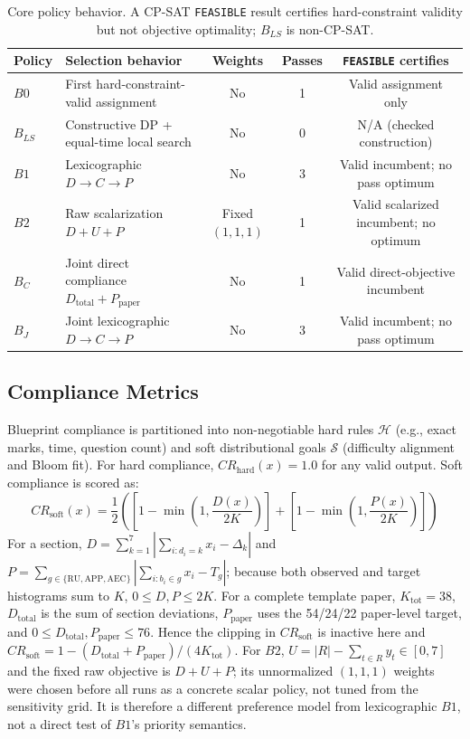 \documentclass[runningheads]{llncs}
\begin{document}
\begin{table}[t]
\caption{Core policy behavior. A CP-SAT \texttt{FEASIBLE} result certifies hard-constraint validity but not objective optimality; $B_{LS}$ is non-CP-SAT.}
\label{tab:policy_behavior}
\centering
\scriptsize
\begin{tabular}{@{}lp{3.5cm}ccc@{}}
\toprule
Policy & Selection behavior & Weights & Passes & \texttt{FEASIBLE} certifies \\
\midrule
$B0$ & First hard-constraint-valid assignment & No & 1 & Valid assignment only \\
$B_{LS}$ & Constructive DP + equal-time local search & No & 0 & N/A (checked construction) \\
$B1$ & Lexicographic $D\to C\to P$ & No & 3 & Valid incumbent; no pass optimum \\
$B2$ & Raw scalarization $D+U+P$ & Fixed $(1,1,1)$ & 1 & Valid scalarized incumbent; no optimum \\
$B_C$ & Joint direct compliance $D_{\mathrm{total}}+P_{\mathrm{paper}}$ & No & 1 & Valid direct-objective incumbent \\
$B_J$ & Joint lexicographic $D\to C\to P$ & No & 3 & Valid incumbent; no pass optimum \\
\bottomrule
\end{tabular}
\end{table}

\subsection{Compliance Metrics}
Blueprint compliance is partitioned into non-negotiable hard rules $\mathcal{H}$ (e.g., exact marks, time, question count) and soft distributional goals $\mathcal{S}$ (difficulty alignment and Bloom fit). For hard compliance, $CR_{\mathrm{hard}}(x) = 1.0$ for any valid output. Soft compliance is scored as:
\begin{equation}
CR_{\mathrm{soft}}(x) = \frac{1}{2} \left( \left[1 - \min\left(1, \frac{D(x)}{2K}\right)\right] + \left[1 - \min\left(1, \frac{P(x)}{2K}\right)\right] \right)
\end{equation}
For a section, $D=\sum_{k=1}^{7}|\sum_{i:d_i=k}x_i-\Delta_k|$ and $P=\sum_{g\in\{\mathrm{RU,APP,AEC}\}}|\sum_{i:b_i\in g}x_i-T_g|$; because both observed and target histograms sum to $K$, $0\leq D,P\leq2K$. For a complete template paper, $K_{\mathrm{tot}}=38$, $D_{\mathrm{total}}$ is the sum of section deviations, $P_{\mathrm{paper}}$ uses the 54/24/22 paper-level target, and $0\leq D_{\mathrm{total}},P_{\mathrm{paper}}\leq76$. Hence the clipping in $CR_{\mathrm{soft}}$ is inactive here and $CR_{\mathrm{soft}}=1-(D_{\mathrm{total}}+P_{\mathrm{paper}})/(4K_{\mathrm{tot}})$. For $B2$, $U=|R|-\sum_{t\in R}y_t\in[0,7]$ and the fixed raw objective is $D+U+P$; its unnormalized $(1,1,1)$ weights were chosen before all runs as a concrete scalar policy, not tuned from the sensitivity grid. It is therefore a different preference model from lexicographic $B1$, not a direct test of $B1$'s priority semantics.
\end{document}
